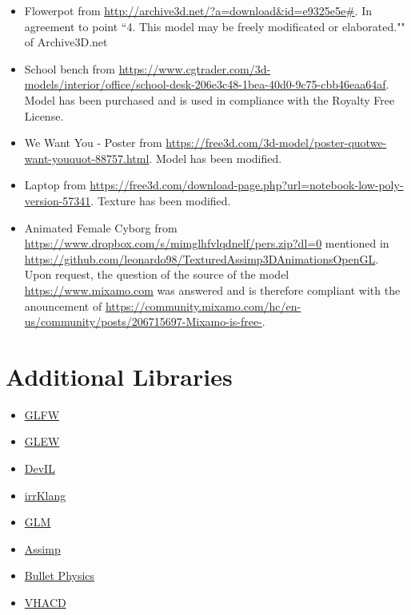 \documentclass[12pt]{article}
\begin{document}
\begin{itemize}
\item Flowerpot from \url{http://archive3d.net/?a=download\&id=e9325e5e#}. In agreement to point ``4. This model may be freely modificated or elaborated."" of Archive3D.net


\item School bench from
\url{ https://www.cgtrader.com/3d-models/interior/office/school-desk-206e3c48-1bea-40d0-9c75-cbb46eaa64af}. Model has been purchased and is used in compliance with the Royalty Free License.

\item We Want You - Poster from
\url{https://free3d.com/3d-model/poster-quotwe-want-youquot-88757.html}. Model has been modified.

\item Laptop from
\url{https://free3d.com/download-page.php?url=notebook-low-poly-version-57341}. Texture has been modified.
\item Animated Female Cyborg from \url{https://www.dropbox.com/s/mimglhfvlqdnelf/pers.zip?dl=0} mentioned in \url{https://github.com/leonardo98/TexturedAssimp3DAnimationsOpenGL}. Upon request, the question of the  source of the model \url{https://www.mixamo.com} was answered and is therefore compliant with the anouncement of \url{https://community.mixamo.com/hc/en-us/community/posts/206715697-Mixamo-is-free-}.
\end{itemize}


\section{Additional Libraries}

\begin{itemize}
\item \href{http://www.glfw.org/}{GLFW}
\item \href{http://glew.sourceforge.net/}{GLEW}
\item \href{http://openil.sourceforge.net/}{DevIL}
\item \href{http://www.ambiera.com/irrklang/index.html}{irrKlang}
\item \href{http://glm.g-truc.net}{GLM }
\item \href{http://www.assimp.org}{Assimp}
\item \href{http://bulletphysics.org/}{Bullet Physics}
\item \href{https://github.com/kmammou/v-hacd}{VHACD}
\end{itemize}
\end{document}

